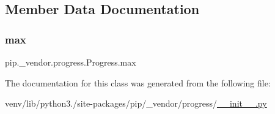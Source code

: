 \subsection{Member Data Documentation}
\mbox{\label{classpip_1_1__vendor_1_1progress_1_1Progress_ae26e5c93bb50b02076a588cb26465c1c}} 
\subsubsection{\texorpdfstring{max}{max}}
{\footnotesize\ttfamily pip.\+\_\+vendor.\+progress.\+Progress.\+max}



The documentation for this class was generated from the following file\+:\begin{DoxyCompactItemize}
\item 
venv/lib/python3./site-\/packages/pip/\+\_\+vendor/progress/\hyperlink{venv_2lib_2python3_89_2site-packages_2pip_2__vendor_2progress_2____init_____8py}{\+\_\+\+\_\+init\+\_\+\+\_\+.\+py}\end{DoxyCompactItemize}
